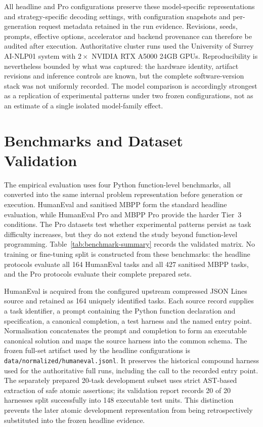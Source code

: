 All headline and Pro configurations preserve these model-specific representations and strategy-specific decoding settings, with configuration snapshots and per-generation request metadata retained in the run evidence. Revisions, seeds, prompts, effective options, accelerator and backend provenance can therefore be audited after execution. Authoritative cluster runs used the University of Surrey AI-NLP01 system with $2\times$ NVIDIA RTX A5000 24GB GPUs. Reproducibility is nevertheless bounded by what was captured: the hardware identity, artifact revisions and inference controls are known, but the complete software-version stack was not uniformly recorded. The model comparison is accordingly strongest as a replication of experimental patterns under two frozen configurations, not as an estimate of a single isolated model-family effect.

\section{Benchmarks and Dataset Validation}
\label{sec:benchmark-validation}

The empirical evaluation uses four Python function-level benchmarks, all converted into the same internal problem representation before generation or execution. HumanEval and sanitised MBPP form the standard headline evaluation, while HumanEval Pro and MBPP Pro provide the harder Tier~3 conditions. The Pro datasets test whether experimental patterns persist as task difficulty increases, but they do not extend the study beyond function-level programming. Table~\ref{tab:benchmark-summary} records the validated matrix. No training or fine-tuning split is constructed from these benchmarks: the headline protocols evaluate all 164 HumanEval tasks and all 427 sanitised MBPP tasks, and the Pro protocols evaluate their complete prepared sets.

HumanEval is acquired from the configured upstream compressed JSON Lines source and retained as 164 uniquely identified tasks. Each source record supplies a task identifier, a prompt containing the Python function declaration and specification, a canonical completion, a test harness and the named entry point. Normalisation concatenates the prompt and completion to form an executable canonical solution and maps the source harness into the common schema. The frozen full-set artifact used by the headline configurations is \texttt{data/normalized/humaneval.jsonl}. It preserves the historical compound harness used for the authoritative full runs, including the call to the recorded entry point. The separately prepared 20-task development subset uses strict AST-based extraction of safe atomic assertions; its validation report records 20 of 20 harnesses split successfully into 148 executable test units. This distinction prevents the later atomic development representation from being retrospectively substituted into the frozen headline evidence.

